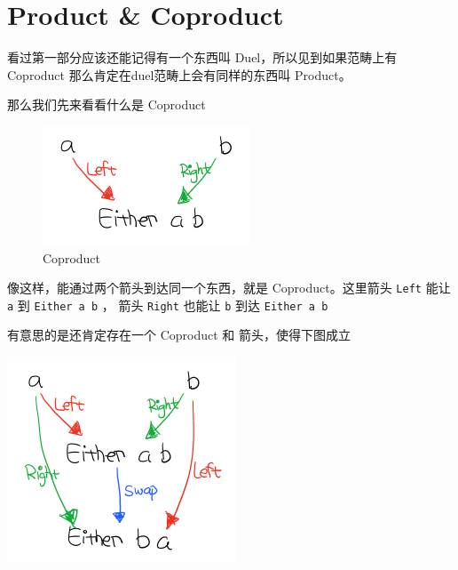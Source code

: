 \documentclass[11pt]{tufte-book}
\begin{document}
\section{Product \& Coproduct}
\label{sec:org94ad970}
看过第一部分应该还能记得有一个东西叫 Duel，所以见到如果范畴上有 Coproduct 那么肯定在duel范畴上会有同样的东西叫 Product。

那么我们先来看看什么是 Coproduct

\begin{figure}[htbp]
\centering
\includegraphics[width=.9\linewidth]{images/p2-coproduct.png}
\caption{Coproduct}
\end{figure}

像这样，能通过两个箭头到达同一个东西，就是 Coproduct。这里箭头 \texttt{Left} 能让 \texttt{a} 到 \texttt{Either a b} ， 箭头 \texttt{Right} 也能让 \texttt{b} 到达 \texttt{Either a b}

有意思的是还肯定存在一个 Coproduct 和 箭头，使得下图成立
\begin{center}
\includegraphics[width=.9\linewidth]{images/p2-coproduct-law.png}
\end{center}
\end{document}
